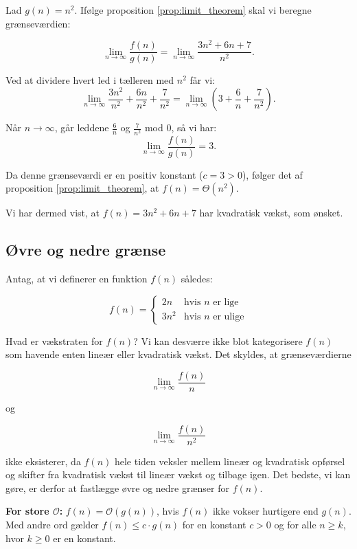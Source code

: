 \begin{solution}Lad $g(n) = n^2$. Ifølge proposition \ref{prop:limit_theorem} skal vi beregne grænseværdien:
    
    \[
    \lim_{n \to \infty} \frac{f(n)}{g(n)} = \lim_{n \to \infty} \frac{3n^2 + 6n + 7}{n^2}.
    \]
    
    Ved at dividere hvert led i tælleren med $n^2$ får vi:
    \[
    \lim_{n \to \infty} \frac{3n^2}{n^2} + \frac{6n}{n^2} + \frac{7}{n^2} = \lim_{n \to \infty} \left( 3 + \frac{6}{n} + \frac{7}{n^2} \right).
    \]
    
    Når $n \to \infty$, går leddene $\frac{6}{n}$ og $\frac{7}{n^2}$ mod $0$, så vi har:
    \[
    \lim_{n \to \infty} \frac{f(n)}{g(n)} = 3.
    \]
    
    Da denne grænseværdi er en positiv konstant ($c = 3 > 0$), følger det af proposition \ref{prop:limit_theorem}, at $f(n) = \Theta(n^2)$.
    
    Vi har dermed vist, at $f(n) = 3n^2 + 6n + 7$ har kvadratisk vækst, som ønsket.
    \end{solution}
    

\subsection*{Øvre og nedre grænse}

Antag, at vi definerer en funktion \( f(n) \) således:

\[
f(n) = 
\begin{cases} 
2n & \text{hvis } n \text{ er lige} \\ 
3n^2 & \text{hvis } n \text{ er ulige} 
\end{cases}
\]

Hvad er vækstraten for \( f(n) \)? Vi kan desværre ikke blot kategorisere \( f(n) \) som havende enten lineær eller kvadratisk vækst. Det skyldes, at grænseværdierne

\[
\lim_{n \rightarrow \infty} \frac{f(n)}{n}
\]

og

\[
\lim_{n \rightarrow \infty} \frac{f(n)}{n^2}
\]

ikke eksisterer, da \( f(n) \) hele tiden veksler mellem lineær og kvadratisk opførsel og skifter fra kvadratisk vækst til lineær vækst og tilbage igen. Det bedste, vi kan gøre, er derfor at fastlægge øvre og nedre grænser for \( f(n) \).

\textbf{For store $\mathcal{O}$: }\( f(n) = \mathcal{O}(g(n)) \), hvis \( f(n) \) ikke vokser hurtigere end \( g(n) \). Med andre ord gælder \( f(n) \leq c \cdot g(n) \) for en konstant \( c > 0 \) og for alle \( n \geq k \), hvor \( k \geq 0 \) er en konstant.

